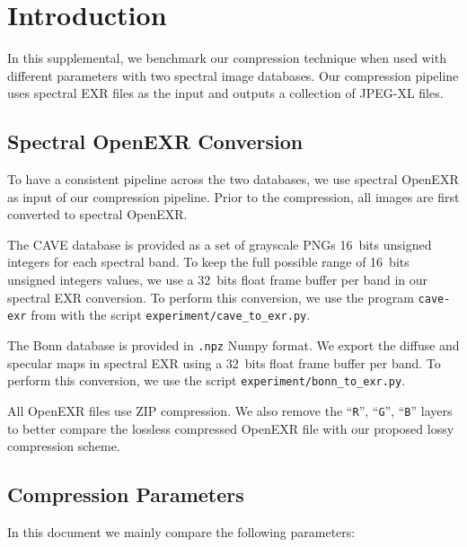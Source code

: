 \section{Introduction}

In this supplemental, we benchmark our compression technique when used with different parameters with two spectral image databases. Our compression pipeline uses spectral EXR files as the input and outputs a collection of JPEG-XL files.


\subsection{Spectral OpenEXR Conversion}

To have a consistent pipeline across the two databases, we use spectral OpenEXR as input of our compression pipeline. Prior to the compression, all images are first converted to spectral OpenEXR.

The CAVE database is provided as a set of grayscale PNGs 16~bits unsigned integers for each spectral band. To keep the full possible range of 16~bits unsigned integers values, we use a 32~bits float frame buffer per band in our spectral EXR conversion. To perform this conversion, we use the program \verb?cave-exr? from with the script \verb?experiment/cave_to_exr.py?.

The Bonn database is provided in \verb?.npz? Numpy format. We export the diffuse and specular maps in spectral EXR using a 32~bits float frame buffer per band. To perform this conversion, we use the script \verb?experiment/bonn_to_exr.py?.

All OpenEXR files use ZIP compression. We also remove the ``\verb?R?'', ``\verb?G?'', ``\verb?B?'' layers to better compare the lossless compressed OpenEXR file with our proposed lossy compression scheme.


\subsection{Compression Parameters}

In this document we mainly compare the following parameters:

